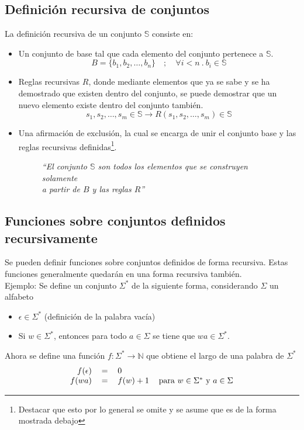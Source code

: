 \documentclass[../main.tex]{subfiles}
\begin{document}
\subsection{Definición recursiva de conjuntos}
La definición recursiva de un conjunto $\mathds{S}$ consiste en:
\begin{itemize}
    \item Un conjunto de base tal que cada elemento del conjunto pertenece a $\mathds{S}$.
    \[ B = \{ b_1, b_2, \ldots, b_n \} \quad ; \quad \forall i < n\ .\ b_i \in \mathds{S} \]
    \item Reglas recursivas $R$, donde mediante elementos que ya se sabe y se ha demostrado que existen dentro del conjunto, se puede demostrar que un nuevo elemento existe dentro del conjunto también.
    \[ s_1, s_2, \ldots, s_m \in \mathds{S} \rightarrow R(s_1, s_2, \ldots, s_m) \in \mathds{S} \]
    \item Una afirmación de exclusión, la cual se encarga de unir el conjunto base y las reglas recursivas definidas\footnote{Destacar que esto por lo general se omite y se asume que es de la forma mostrada debajo}.
    \begin{figure}[H]
        \centering
        \textit{``El conjunto $\mathds{S}$ son todos los elementos que se construyen solamente}\\
        \textit{a partir de $B$ y las reglas $R$''}
    \end{figure}
\end{itemize}
\subsection{Funciones sobre conjuntos definidos recursivamente}
Se pueden definir funciones sobre conjuntos definidos de forma recursiva. Estas funciones generalmente quedarán en una forma recursiva también.\\
Ejemplo: Se define un conjunto $\Sigma^*$ de la siguiente forma, considerando $\Sigma$ un alfabeto
\begin{itemize}
    \item $\epsilon \in \Sigma^*$ (definición de la palabra vacía)
    \item Si $w \in \Sigma^*$, entonces para todo $a \in \Sigma$ se tiene que $wa \in \Sigma^*$.
\end{itemize}
Ahora se define una función $f: \Sigma^* \rightarrow \mathds{N}$ que obtiene el largo de una palabra de $\Sigma^*$
\[
    \begin{tabular}{rcll}
        $f(\epsilon)$ & $=$ & $0$\\
        $f(wa)$ & $=$ & $f(w) + 1$ & para $w \in \Sigma^*$ y $a \in \Sigma$
    \end{tabular}
\]
\end{document}
